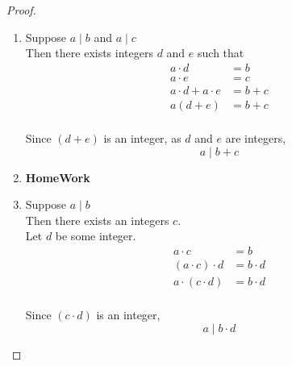 \documentclass[fleqn,letterpaper,10pt,twoside]{report}
\theoremstyle{plain}
\theoremstyle{definition}
\theoremstyle{remark}
\begin{document}
\begin{proof}{\ }

   \begin{enumerate}

      \item{}

         Suppose \(a \mid b\) and \(a \mid c\) \\
         Then there exists integers \(d\) and \(e\) such that
         \begin{equation*}
            \begin{split}
               a \cdot d & = b \\
               a \cdot e & = c \\
               a \cdot d + a \cdot e & = b + c \\
               a (d + e) & = b + c \\
            \end{split}
         \end{equation*}

         Since \((d + e)\) is an integer, as \(d\) and \(e\) are integers,
         \[a \mid b + c\]

      \item{\textbf{HomeWork}}

      \item{}

         Suppose \(a \mid b\) \\
         Then there exists an integers \(c\).\\
         Let \(d\) be some integer.
         \begin{equation*}
            \begin{split}
               a \cdot c & = b \\
               (a \cdot c) \cdot d & = b \cdot d \\
               a \cdot (c \cdot d) & = b \cdot d \\
            \end{split}
         \end{equation*}

         Since \((c \cdot d)\) is an integer,
         \[a \mid b \cdot d\]

   \end{enumerate}
\end{proof}
\end{document}
